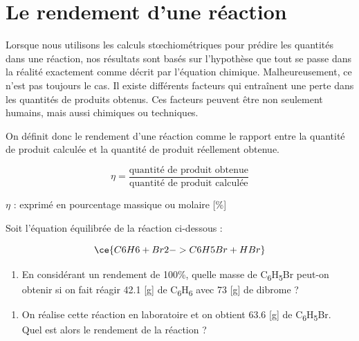 \documentclass[
  11pt,
  a4paper,
  openany]{book}
\providecommand{\tightlist}{%
  \setlength{\itemsep}{0pt}\setlength{\parskip}{0pt}}
\begin{document}
\section{Le rendement d'une réaction}\label{le-rendement-dune-ruxe9action}

Lorsque nous utilisons les calculs stœchiométriques pour prédire les quantités dans une réaction, nos résultats sont basés sur l'hypothèse que tout se passe dans la réalité exactement comme décrit par l'équation chimique. Malheureusement, ce n'est pas toujours le cas. Il existe différents facteurs qui entraînent une perte dans les quantités de produits obtenus. Ces facteurs peuvent être non seulement humains, mais aussi chimiques ou techniques.

On définit donc le rendement d'une réaction comme le rapport entre la quantité de produit calculée et la quantité de produit réellement obtenue.

\[ \eta = \frac{\text{quantité de produit obtenue}}{\text{quantité de produit calculée}} \]

\(\eta\) : exprimé en pourcentage massique ou molaire {[}\%{]}

\newpage

\begin{Exercise}

Soit l'équation équilibrée de la réaction ci-dessous :

\[ \ce{C6H6 + Br2 -> C6H5Br + HBr} \]

\begin{enumerate}
\def\labelenumi{\arabic{enumi}.}
\tightlist
\item
  En considérant un rendement de 100\%, quelle masse de C\textsubscript{6}H\textsubscript{5}Br peut-on obtenir si on fait réagir 42.1 {[}g{]} de C\textsubscript{6}H\textsubscript{6} avec 73 {[}g{]} de dibrome ?
\end{enumerate}


\begin{enumerate}
\def\labelenumi{\arabic{enumi}.}
\setcounter{enumi}{1}
\tightlist
\item
  On réalise cette réaction en laboratoire et on obtient 63.6 {[}g{]} de C\textsubscript{6}H\textsubscript{5}Br. Quel est alors le rendement de la réaction ?
\end{enumerate}


\end{Exercise}
\end{document}
